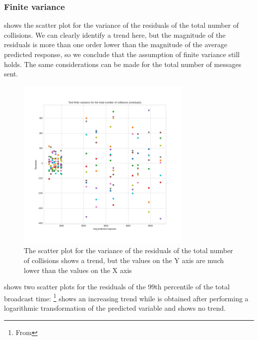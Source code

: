 \subsubsection{Finite variance}\label{hdassumptionsvariance}

 shows the scatter plot for the variance of the
residuals of the total number of collisions. We can clearly identify a trend
here, but the magnitude of the residuals is more than one order lower than the
magnitude of the average predicted response, so we conclude that the assumption
of finite variance still holds. The same considerations can be made for the
total number of messages sent.

\begin{figure}[htb]
	\centering
	\includegraphics[width=0.75\textwidth]{img/hd/collisions-variance}
	\caption{The scatter plot for the variance of the residuals of the total
	number of collisions shows a trend, but the values on the Y axis are
	much lower than the values on the X
	axis}\label{fig:hdcollisionsvariance}
\end{figure}

 shows two scatter plots for the residuals of the
99th percentile of the total broadcast time:
\footnote{From
} shows an increasing trend while
 is obtained after performing a logarithmic
transformation of the predicted variable and shows no trend.

